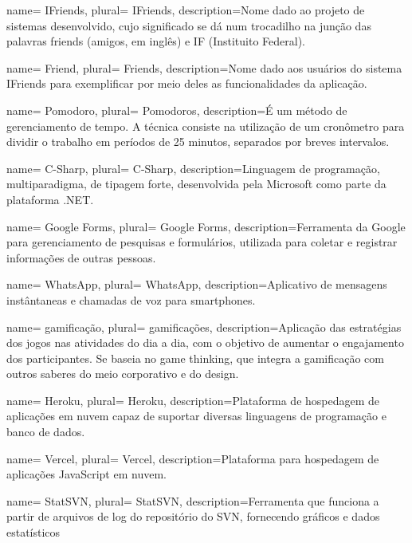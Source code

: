  {
    name= IFriends,
    plural= {IFriends},
    description={Nome dado ao projeto de sistemas desenvolvido, cujo significado se dá num trocadilho na junção das palavras friends (amigos, em inglês) e IF (Instituito Federal).}
}

 {
    name= Friend,
    plural= {Friends},
    description={Nome dado aos usuários do sistema IFriends para exemplificar por meio deles as funcionalidades da aplicação.}
}

 {
    name= Pomodoro,
    plural= {Pomodoros},
    description={É um método de gerenciamento de tempo. A técnica consiste na utilização de um cronômetro para dividir o trabalho em períodos de 25 minutos, separados por breves intervalos.}
}

 {
    name= C-Sharp,
    plural= {C-Sharp},
    description={Linguagem de programação, multiparadigma, de tipagem forte, desenvolvida pela Microsoft como parte da plataforma .NET. }
}

 {
    name= Google Forms,
    plural= {Google Forms},
    description={Ferramenta da Google para gerenciamento de pesquisas e formulários, utilizada para coletar e registrar informações de outras pessoas. }
}

 {
    name= WhatsApp,
    plural= {WhatsApp},
    description={Aplicativo de mensagens instântaneas e chamadas de voz para smartphones. }
}

 {
    name= gamificação,
    plural= {gamificações},
    description={Aplicação das estratégias dos jogos nas atividades do dia a dia, com o objetivo de aumentar o engajamento dos participantes. Se baseia no game thinking, que integra a gamificação com outros saberes do meio corporativo e do design. }
}

 {
    name= Heroku,
    plural= {Heroku},
    description={Plataforma de hospedagem de aplicações em  nuvem capaz de suportar diversas linguagens de programação e banco de dados.}
}

 {
    name= Vercel,
    plural= {Vercel},
    description={Plataforma para hospedagem de aplicações JavaScript em nuvem.}
}

 {
    name= StatSVN,
    plural= {StatSVN},
    description={Ferramenta que funciona a partir de arquivos de log do repositório do SVN, fornecendo gráficos e dados estatísticos}
}

